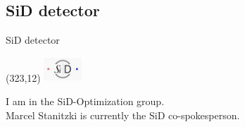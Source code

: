 \documentclass[xcolor={dvipsnames}]{beamer}
\newcommand{\sidlogo}{
  \setlength{\TPHorizModule}{1pt}
  \setlength{\TPVertModule}{1pt}
  \begin{textblock}{1}(323,12)
   \includegraphics[width=40pt,height=26pt]{figures/SiD.jpeg}
  \end{textblock}
  }
\begin{document}
\subsection{SiD detector}
\begin{frame}{SiD detector}
\sidlogo
 I am in the SiD-Optimization group.\\
 Marcel Stanitzki is currently the SiD co-spokesperson.\\
\end{frame}
\end{document}
